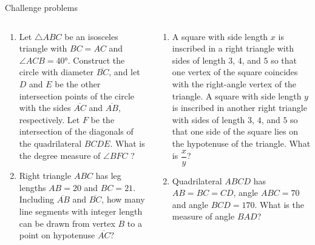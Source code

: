 \documentclass[9pt,aspectratio=169]{beamer}
\begin{document}
\begin{frame}{Challenge problems}
  \begin{columns}[T]
    \begin{column}{0.5\textwidth}
      \begin{enumerate}
        \item Let $\triangle ABC$ be an isosceles triangle with $BC = AC$ and $\angle ACB = 40°$. Construct the circle with diameter $\overline{BC}$, and let $D$ and $E$ be the other intersection points of the circle with the sides $\overline{AC}$ and $\overline{AB}$, respectively. Let $F$ be the intersection of the diagonals of the quadrilateral $BCDE$. What is the degree measure of $\angle BFC$ ?  %
        \item Right triangle $ABC$ has leg lengths $AB=20$ and $BC=21$. Including $\overline{AB}$ and $\overline{BC}$, how many line segments with integer length can be drawn from vertex $B$ to a point on hypotenuse $\overline{AC}$? %
        \seti
      \end{enumerate}
    \end{column}
    \begin{column}{0.5\textwidth}
      \begin{enumerate}
        \conti
        \item A square with side length $x$ is inscribed in a right triangle with sides of length $3$, $4$, and $5$ so that one vertex of the square coincides with the right-angle vertex of the triangle. A square with side length $y$ is inscribed in another right triangle with sides of length $3$, $4$, and $5$ so that one side of the square lies on the hypotenuse of the triangle. What is $\dfrac{x}{y}$? %
        \item Quadrilateral $ABCD$ has $AB = BC = CD$, angle $ABC = 70$ and angle $BCD = 170$. What is the measure of angle $BAD$? %
      \end{enumerate}
    \end{column}
  \end{columns}
\end{frame}

\end{document}
